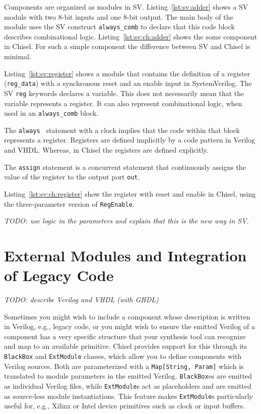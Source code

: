 \documentclass[%
    10pt,
    headinclude, footexclude,
    openright, %
    notitlepage,
    cleardoubleempty,
    headsepline,
    pointlessnumbers,
    bibtotoc, idxtotoc,
    ]{scrbook}
\newcommand{\code}[1]{{\small{\texttt{#1}}}}
\newcommand{\todo}[1]{{\emph{TODO: #1}}}
\begin{document}


Components are organized as modules in SV.
Listing~\ref{lst:sv:adder} shows a SV module with two 8-bit inputs and one 8-bit
output. The main body of the module uses the SV construct \code{always\_comb}
to declare that this code block describes combinational logic.
Listing~\ref{lst:sv:ch:adder} shows the some component in Chisel.
For such a simple component the difference between SV and Chisel is minimal.


Listing~\ref{lst:sv:register} shows a module that contains the definition of a
register (\code{reg\_data}) with a synchronous reset and an enable input in SystemVerilog.
The SV \code{reg} keywords declares a variable. This does not necessarily mean
that the variable represents a register. It can also represent combinational logic,
when used in an \code{always\_comb} block.

The \code{always \@} statement with a clock implies that the code within that block
represents a register. Registers are defined implicitly by a code pattern in Verilog
and VHDL. Whereas, in Chisel the registers are defined explicitly.

The \code{assign} statement is a concurrent statement that continuously
assigns the value of the register to the output port \code{out}.


Listing~\ref{lst:sv:ch:register} show the register with reset and enable in Chisel, using
the three-parameter version of \code{RegEnable}.


\todo{use logic in the parameters and explain that this is the new way in SV.}

\section{External Modules and Integration of Legacy Code}

\todo{describe Verilog and VHDL (with GHDL)}

Sometimes you might wish to include a component whose description is
written in Verilog, e.g., legacy code, or you might wish to ensure the emitted Verilog of a component
has a very specific structure that your synthesis tool can recognize and map to an
available primitive. Chisel provides support for this through its \code{BlackBox} and
\code{ExtModule} classes, which allow you to define components with Verilog sources.
Both are parameterized with a \code{Map[String, Param]} which is translated to module
parameters in the emitted Verilog. \code{BlackBox}es are emitted as individual Verilog
files, while \code{ExtModule}s act as placeholders and are emitted as source-less module
instantiations. This feature makes \code{ExtModule}s particularly useful for, e.g.,
Xilinx or Intel device primitives such as clock or input buffers.
\end{document}
